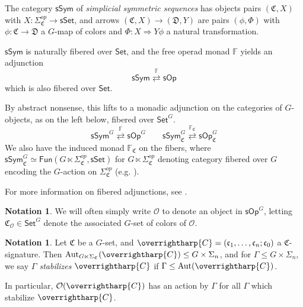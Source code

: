 \documentclass[a4paper,10pt
,draft
]{article}%
\numberwithin{equation}{section}
\numberwithin{figure}{section}
\theoremstyle{definition} %
\newtheorem{notation}[equation]{Notation}%
\newcommand{\vect}[1]{\text{\overrightharp{\ensuremath{#1}}}}
\newcommand{\Set}{\ensuremath{\mathsf{Set}}}
\newcommand{\sSet}{\ensuremath{\mathsf{sSet}}}%
\newcommand{\sOp}{\ensuremath{\mathsf{sOp}}}%
\newcommand{\sSym}{\ensuremath{\mathsf{sSym}}}%
\newcommand{\Fun}{\mathsf{Fun}}
\DeclareMathOperator{\Aut}{Aut}%
\renewcommand{\O}{\ensuremath{\mathcal O}}
\newcommand{\1}{\ensuremath{\mathbbm 1}}%
\begin{document}
The category $\mathsf{sSym}$ of \textit{simplicial symmetric sequences} has
objects pairs $(\mathfrak C, X)$ with $X \colon \Sigma_{\mathfrak C}^{op} \to \sSet$,
and arrows $(\mathfrak C, X) \to (\mathfrak D, Y)$ are pairs $(\phi, \Phi)$ with
$\phi \colon \mathfrak C \to \mathfrak D$ a $G$-map of colors and
$\Phi \colon X \Rightarrow Y \phi$ a natural transformation.

$\sSym$ is naturally fibered over $\Set$,
and the free operad monad $\mathbb F$ yields an adjunction
\[
      \sSym \overset{\mathbb F}{\rightleftarrows} \sOp
\]
which is also fibered over $\Set$.

By abstract nonsense, this lifts to a monadic adjunction on the categories of $G$-objects, as on the left below, fibered over $\Set^G$.
\[
      \sSym^G \overset{\mathbb F}{\rightleftarrows} \sOp^G
      \qquad
      \sSym^G_{\mathfrak C} \overset{\mathbb F_{\mathfrak C}}{\rightleftarrows} \sOp^G_{\mathfrak C}
\]
We also have the induced monad $\mathbb F_{\mathfrak C}$ on the fibers,
where $\sSym^G_{\mathfrak C} \simeq \Fun(G \ltimes \Sigma_{\mathfrak C}^{op}, \sSet)$ for
$G \ltimes \Sigma_{\mathfrak C}^{op}$ denoting category fibered over $G$ encoding the $G$-action on $\Sigma_{\mathfrak C}^{op}$ (e.g. \cite[Example 2.13]{BP_HGOP}).

For more information on fibered adjunctions, see \cite[\S 2.2]{BP_HGOP}.


\begin{notation}
      We will often simply write $\O$ to denote an object in $\sOp^G$,
      letting $\mathfrak C_\O \in \Set^G$ denote the associated $G$-set of colors of $\O$.
\end{notation}

\begin{notation}
      Let $\mathfrak C$ be a $G$-set, and $\vect C = (\mathfrak c_1, \dots, \mathfrak c_n; \mathfrak c_0)$ a $\mathfrak C$-signature.
      Then $\Aut_{G \ltimes \Sigma_{\mathfrak C}}(\vect C) \leq G \times \Sigma_n$,
      and for $\Gamma \leq G \times \Sigma_n$, we say \textit{$\Gamma$ stabilizes $\vect C$} if $\Gamma \leq \Aut(\vect C)$.

      In particular, $\O(\vect C)$ has an action by $\Gamma$ for all $\Gamma$ which stabilize $\vect C$.
\end{notation}
\end{document}
